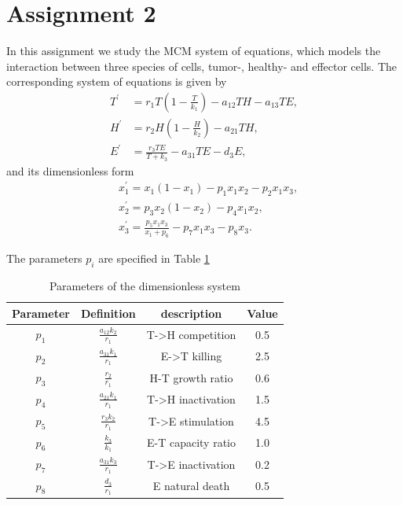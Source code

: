 \section{Assignment 2}
In this assignment we study the MCM system of equations, which models the interaction between three species of cells,
tumor-, healthy- and effector cells. The corresponding system of equations is given by
\begin{align*}
    T^{\prime} & =r_1 T\left(1-\frac{T}{k_1}\right)-a_{12} T H-a_{13} T E, \\
    H^{\prime} & =r_2 H\left(1-\frac{H}{k_2}\right)-a_{21} T H, \\
    E^{\prime} & =\frac{r_3 T E}{T+k_3}-a_{31} T E-d_3 E ,
\end{align*}
and its dimensionless form
\begin{align*}
    & x_1^{\prime}=x_1\left(1-x_1\right)-p_1 x_1 x_2-p_2 x_1 x_3, \\
    & x_2^{\prime}=p_3 x_2\left(1-x_2\right)-p_4 x_1 x_2, \\
    & x_3^{\prime}=\frac{p_5 x_1 x_3}{x_1+p_6}-p_7 x_1 x_3-p_8 x_3 .
\end{align*}

The parameters $p_i$ are specified in Table \ref{tab:mcm_parameters}
\begin{table}[H]
    \centering
    \begin{tabular}{|c|c|c|c|}
        \hline
        Parameter   & Definition                & description           & Value \\
        \hline
        $p_1$       & $\frac{a_{12}k_2}{r_1}$     & T->H competition      & 0.5 \\
        $p_2$       & $\frac{a_{31}k_1}{r_1}$     & E->T killing          & 2.5 \\
        $p_3$       & $\frac{r_2}{r_1}      $     & H-T growth ratio      & 0.6 \\
        $p_4$       & $\frac{a_{21}k_1}{r_1}$     & T->H inactivation     & 1.5 \\
        $p_5$       & $\frac{r_3k_2}{r_1}   $     & T->E stimulation      & 4.5 \\
        $p_6$       & $\frac{k_3}{k_1}      $     & E-T capacity ratio    & 1.0 \\
        $p_7$       & $\frac{a_{31}k_3}{r_1}$     & T->E inactivation     & 0.2 \\
        $p_8$       & $\frac{d_3}{r_1}      $     & E natural death       & 0.5 \\
        \hline
    \end{tabular}
    \caption{Parameters of the dimensionless system}
    \label{tab:mcm_parameters}
\end{table}

